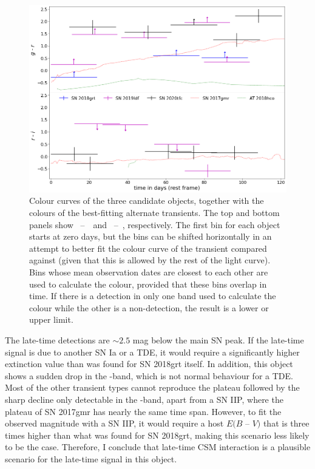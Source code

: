 \documentclass[a4paper,oneside,12pt, class=Latex/Classes/PhDthesisPSnPDF, crop=false]{standalone}
\begin{document}
\begin{figure}
 \centering
 \includegraphics[width=13cm]{../Images/chapter_3/candid_colours.png}
 \caption[Colour curves of the three candidate objects.]{Colour curves of the three candidate objects, together with the colours of the best-fitting alternate transients. The top and bottom panels show \ztfg~--~\ztfr\, and \ztfr~--~\ztfi, respectively. The first bin for each object starts at zero days, but the bins can be shifted horizontally in an attempt to better fit the colour curve of the transient compared against (given that this is allowed by the rest of the light curve). Bins whose mean observation dates are closest to each other are used to calculate the colour, provided that these bins overlap in time. If there is a detection in only one band used to calculate the colour while the other is a non-detection, the result is a lower or upper limit.}
 \label{candidate_colours}
\end{figure}

The late-time detections are $\sim2.5$ mag below the main SN peak. If the late-time signal is due to another SN Ia or a TDE, it would require a significantly higher extinction value than was found for SN 2018grt itself. In addition, this object shows a sudden drop in the \ztfr-band, which is not normal behaviour for a TDE. Most of the other transient types cannot reproduce the plateau followed by the sharp decline only detectable in the \ztfr-band, apart from a SN IIP, where the plateau of SN 2017gmr has nearly the same time span. However, to fit the observed magnitude with a SN IIP, it would require a host $ E(B$ -- $V)$ that is three times higher than what was found for SN 2018grt, making this scenario less likely to be the case. Therefore, I conclude that late-time CSM interaction is a plausible scenario for the late-time signal in this object.
\end{document}
